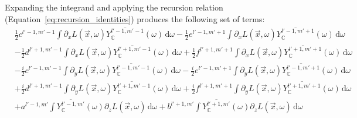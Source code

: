 \documentclass{egpubl}
\newcommand{\ud}{\,\mathrm{d}} %
\begin{document}
Expanding the integrand and applying the recursion relation (Equation~\ref{eq:recursion_identities}) produces the following set of terms:
\begin{align*}
&
\frac{1}{2}c^{{l'-1,m'-1}}\int{\partial_xL\left (\vec{x} ,\omega \right )\overline{Y_{\mathbb{C}}^{l'-1, m'-1}}(\omega )\ud\omega}
-\frac{1}{2}e^{{l'-1,m'+1}}\int{\partial_xL\left (\vec{x} ,\omega \right )\overline{Y_{\mathbb{C}}^{l'-1, m'+1}}(\omega )\ud\omega}
\\&
-\frac{1}{2}d^{{l'+1,m'-1}}\int{\partial_xL\left (\vec{x} ,\omega \right )\overline{Y_{\mathbb{C}}^{l'+1, m'-1}}(\omega )\ud\omega}
+\frac{1}{2}f^{{l'+1,m'+1}}\int{\partial_xL\left (\vec{x} ,\omega \right )\overline{Y_{\mathbb{C}}^{l'+1, m'+1}}(\omega )\ud\omega}
\\&
-\frac{i}{2}c^{{l'-1,m'-1}}\int{\partial_yL\left (\vec{x} ,\omega \right )\overline{Y_{\mathbb{C}}^{l'-1, m'-1}}(\omega )\ud\omega}
-\frac{i}{2}e^{{l'-1,m'+1}}\int{\partial_yL\left (\vec{x} ,\omega \right )\overline{Y_{\mathbb{C}}^{l'-1, m'+1}}(\omega )\ud\omega}
\\&
+\frac{i}{2}d^{{l'+1,m'-1}}\int{\partial_yL\left (\vec{x} ,\omega \right )\overline{Y_{\mathbb{C}}^{l'+1, m'-1}}(\omega )\ud\omega}
+\frac{i}{2}f^{{l'+1,m'+1}}\int{\partial_yL\left (\vec{x} ,\omega \right )\overline{Y_{\mathbb{C}}^{l'+1, m'+1}}(\omega )\ud\omega}
\\&
+a^{{l'-1,m'}}\int{\overline{Y_{\mathbb{C}}^{l'-1, m'}}(\omega )\partial_zL\left (\vec{x} ,\omega \right )\ud\omega}
+b^{{l'+1,m'}}\int{\overline{Y_{\mathbb{C}}^{l'+1, m'}}(\omega )\partial_zL\left (\vec{x} ,\omega \right )\ud\omega}
\end{align*}
\end{document}

